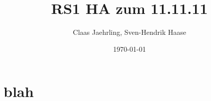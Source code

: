 \documentclass[12pt]{article}
\author{Claas Jaehrling, Sven-Hendrik Haase}
\title{RS1 HA zum 11.11.11}
\date{\today}
\begin{document}
\maketitle

\section{blah}
\end{document}
